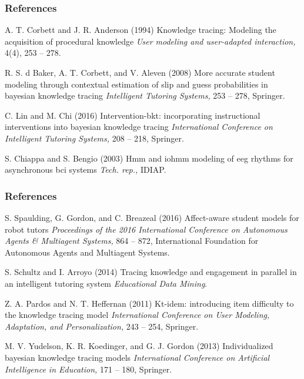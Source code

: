 \documentclass{beamer}
\begin{document}
\begin{frame}
\frametitle{References}
\begin{footnotesize}
	\begin{thebibliography}{99}
		 A. T. Corbett and J. R. Anderson (1994)
		\newblock Knowledge tracing: Modeling the acquisition of procedural knowledge
		\newblock \emph{User modeling and user-adapted interaction,} 4(4), 253 -- 278.
		
		 R. S. d Baker, A. T. Corbett, and V. Aleven (2008)
		\newblock More accurate student modeling through contextual estimation of slip and guess probabilities in bayesian knowledge tracing
		\newblock \emph{Intelligent Tutoring Systems,} 253 -- 278, Springer.
		
		 C. Lin and M. Chi (2016)
		\newblock Intervention-bkt: incorporating instructional interventions into bayesian knowledge tracing
		\newblock \emph{International Conference on Intelligent Tutoring Systems,} 208 -- 218, Springer.
		
		 S. Chiappa and S. Bengio (2003)
		\newblock Hmm and iohmm modeling of eeg rhythms
for asynchronous bci systems
		\newblock \emph{Tech. rep.,} IDIAP.
	\end{thebibliography}
\end{footnotesize}
\end{frame}

\begin{frame}
\frametitle{References}
\begin{footnotesize}
	\begin{thebibliography}{99}
		 S. Spaulding, G. Gordon, and C. Breazeal (2016)
		\newblock Affect-aware student models for robot tutors
		\newblock \emph{Proceedings of the 2016 International Conference on Autonomous Agents \& Multiagent Systems,} 864 -- 872, International
Foundation for Autonomous Agents and Multiagent Systems.
		
		 S. Schultz and I. Arroyo (2014)
		\newblock Tracing knowledge and engagement in parallel in an intelligent tutoring system
		\newblock \emph{Educational Data Mining}.
		
		 Z. A. Pardos and N. T. Heffernan (2011)
		\newblock Kt-idem: introducing item difficulty to the knowledge tracing model
		\newblock \emph{International Conference on User Modeling, Adaptation, and Personalization,} 243 -- 254, Springer.
		
		 M. V. Yudelson, K. R. Koedinger, and G. J. Gordon (2013)
		\newblock Individualized bayesian knowledge tracing models
		\newblock \emph{International Conference on Artificial Intelligence in Education,} 171 -- 180, Springer.
	\end{thebibliography}
\end{footnotesize}
\end{frame}
\end{document}
